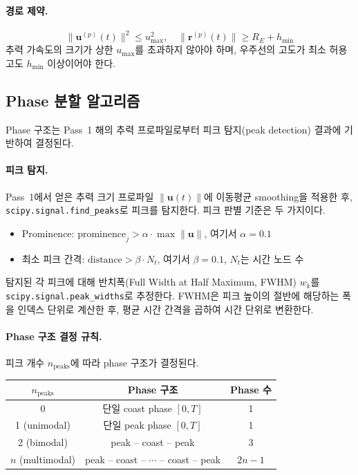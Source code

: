 \documentclass[11pt]{article}
\begin{document}
\paragraph{경로 제약.}
\[
\|\mathbf{u}^{(p)}(t)\|^2 \leq u_{\max}^2, \quad \|\mathbf{r}^{(p)}(t)\| \geq R_E + h_{\min}
\]
추력 가속도의 크기가 상한 $u_{\max}$를 초과하지 않아야 하며, 우주선의 고도가 최소 허용 고도 $h_{\min}$ 이상이어야 한다.


\subsection{Phase 분할 알고리즘}
\label{sec:phase_split}

Phase 구조는 Pass~1 해의 추력 프로파일로부터 피크 탐지(peak detection) 결과에 기반하여 결정된다.

\paragraph{피크 탐지.}
Pass~1에서 얻은 추력 크기 프로파일 $\|\mathbf{u}(t)\|$에 이동평균 smoothing을 적용한 후, \texttt{scipy.signal.find\_peaks}로 피크를 탐지한다.
피크 판별 기준은 두 가지이다.
\begin{itemize}
  \item Prominence: $\text{prominence}_j > \alpha \cdot \max\|\mathbf{u}\|$, 여기서 $\alpha = 0.1$
  \item 최소 피크 간격: $\text{distance} > \beta \cdot N_t$, 여기서 $\beta = 0.1$, $N_t$는 시간 노드 수
\end{itemize}
탐지된 각 피크에 대해 반치폭(Full Width at Half Maximum, FWHM) $w_k$를 \texttt{scipy.signal.peak\_widths}로 추정한다.
FWHM은 피크 높이의 절반에 해당하는 폭을 인덱스 단위로 계산한 후, 평균 시간 간격을 곱하여 시간 단위로 변환한다.

\paragraph{Phase 구조 결정 규칙.}
피크 개수 $n_\text{peaks}$에 따라 phase 구조가 결정된다.

\begin{table}[htbp]
\centering
\begin{tabular}{ccc}
\toprule
$n_\text{peaks}$ & Phase 구조 & Phase 수 \\
\midrule
0 & 단일 coast phase $[0, T]$ & 1 \\
1 (unimodal) & 단일 peak phase $[0, T]$ & 1 \\
2 (bimodal) & peak -- coast -- peak & 3 \\
$n$ (multimodal) & peak -- coast -- $\cdots$ -- coast -- peak & $2n - 1$ \\
\bottomrule
\end{tabular}
\end{table}
\end{document}
